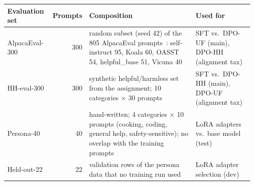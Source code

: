 \begingroup\tablefont\renewcommand{\arraystretch}{1.0}
\begin{tabularx}{\textwidth}{>{\raggedright\arraybackslash}p{2.3cm}r>{\raggedright\arraybackslash}X>{\raggedright\arraybackslash}p{4.1cm}}
\toprule
Evaluation set & Prompts & Composition & Used for \\
\midrule
AlpacaEval-300 & 300 & random subset (seed 42) of the 805 AlpacaEval prompts~\citep{dubois2024lc}: self-instruct 95, Koala 60, OASST 54, helpful\_base 51, Vicuna 40 & SFT vs.\ DPO-UF (main), DPO-HH (alignment tax) \\
HH-eval-300 & 300 & synthetic helpful/harmless set from the assignment; 10 categories $\times$ 30 prompts & SFT vs.\ DPO-HH (main), DPO-UF (alignment tax) \\
Persona-40 & 40 & hand-written; 4 categories $\times$ 10 prompts (cooking, coding, general help, safety-sensitive); no overlap with the training prompts & LoRA adapters vs.\ base model (test) \\
Held-out-22 & 22 & validation rows of the persona data that no training run used & LoRA adapter selection (dev) \\
\bottomrule
\end{tabularx}
\endgroup
